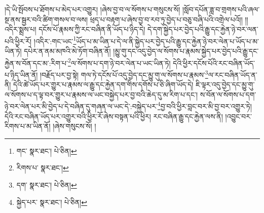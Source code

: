 །དེ་ཡི་སྤོབས་པ་ཐོགས་པ་མེད་པར་འགྱུར། །ཞེས་བྱ་བ་ལ་སོགས་པ་གསུངས་སོ། །སློབ་དཔོན་ཟླ་བ་གྲགས་པའི་ཞལ་སྔ་ནས་སྦྱར་བའི་ཚིག་གསལ་བ་ལས། ཕྲད་པ་བརྟག་པ་ཞེས་བྱ་བ་རབ་ཏུ་བྱེད་པ་བཅུ་བཞི་པའི་འགྲེལ་པའོ།། །།འདིར་སྨྲས་པ། དངོས་པོ་རྣམས་ཀྱི་རང་བཞིན་ནི་ཡོད་པ་ཉིད་དེ། དེ་དག་སྐྱེད་པར་བྱེད་པའི་རྒྱུ་དང་རྐྱེན་ཉེ་བར་ལན་པའི་ཕྱིར་རོ། །འདིར་:གང་ཡང་\footnote{གང་  སྣར་ཐང་།  པེ་ཅིན། }ཡོད་པ་མ་ཡིན་པ་དེ་ལ་ནི་སྐྱེད་པར་བྱེད་པའི་རྒྱུ་དང་རྐྱེན་ཉེ་བར་ལེན་པ་ཡོད་པ་མ་ཡིན་ཏེ། དཔེར་ན་ནམ་མཁའི་མེ་ཏོག་བཞིན་ནོ། །མྱུ་གུ་དང་འདུ་བྱེད་ལ་སོགས་པ་རྣམས་སྐྱེད་པར་བྱེད་པའི་རྒྱུ་དང་རྐྱེན་ས་བོན་དང་མ་:རིག་པ་\footnote{རིགས་པ་  སྣར་ཐང་། }ལ་སོགས་པ་དག་ཉེ་བར་ལེན་པ་ཡང་ཡིན་ཏེ། དེའི་ཕྱིར་དངོས་པོའི་རང་བཞིན་ཡོད་པ་ཉིད་ཡིན་ནོ། །བརྗོད་པར་བྱ་སྟེ། གལ་ཏེ་དངོས་པོ་འདུ་བྱེད་དང་མྱུ་གུ་ལ་སོགས་པ་རྣམས་\footnote{དག་  སྣར་ཐང་།  པེ་ཅིན། }ལ་རང་བཞིན་ཡོད་ན་ནི། དེའི་ཚེ་ཡོད་པར་གྱུར་པ་རྣམས་ལ་རྒྱུ་དང་རྐྱེན་དག་གིས་དགོས་པ་ཅི་ཞིག་ཡོད་དེ། ཇི་ལྟར་འདུ་བྱེད་དང་མྱུ་གུ་ལ་སོགས་པ་ད་ལྟ་བར་གྱུར་པ་རྣམས་ལ་ཡང་བསྐྱེད་པར་བྱ་བའི་ཆེད་དུ་མ་རིག་པ་དང་། ས་བོན་ལ་སོགས་པ་དག་ཉེ་བར་ལེན་པར་མི་བྱེད་པ་དེ་བཞིན་དུ་གཞན་ལ་ཡང་དེ་:བསྐྱེད་པར་\footnote{སྐྱེད་པར་  སྣར་ཐང་།  པེ་ཅིན། }བྱ་བའི་ཕྱིར་བླང་བར་མི་བྱ་བར་འགྱུར་ཏེ། དེའི་རང་བཞིན་ཡོད་པར་འགྱུར་བའི་ཕྱིར་རོ་ཞེས་བསྟན་པའི་ཕྱིར། རང་བཞིན་རྒྱུ་དང་རྐྱེན་ལས་ནི། །འབྱུང་བར་རིགས་པ་མ་ཡིན་ནོ། །ཞེས་གསུངས་སོ། །
